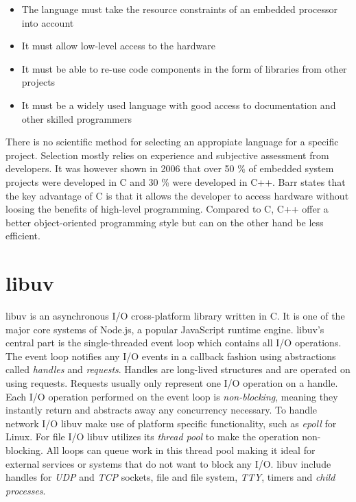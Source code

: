 \begin{itemize}
\item
  The language must take the resource constraints of an embedded processor
  into account
\item
  It must allow low-level access to the hardware
\item
  It must be able to re-use code components in the form of libraries from other
    projects
\item
  It must be a widely used language with good access to documentation and other
    skilled programmers
\end{itemize}

There is no scientific method for selecting an appropiate language for a
specific project. Selection mostly relies on experience and subjective
assessment from developers. It was however shown in 2006 that over 50 \% of
embedded system projects were developed in C and 30 \% were developed in C++.
Barr \cite{barr1999programming} states that the key advantage of C is that it
allows the developer to access hardware without loosing the benefits of
high-level programming. Compared to C, C++ offer a better object-oriented
programming style but can on the other hand be less efficient.
\cite{nahas2012choosing}

\section{libuv}

libuv is an asynchronous I/O cross-platform library written in C. It is one of
the major core systems of Node.js, a popular JavaScript runtime engine. libuv's
central part is the single-threaded event loop which contains all I/O
operations. The event loop notifies any I/O events in a callback fashion using
abstractions called \textit{handles} and \textit{requests}. Handles are
long-lived structures and are operated on using requests. Requests usually only
represent one I/O operation on a handle. Each I/O operation performed on the
event loop is \textit{non-blocking}, meaning they instantly return and
abstracts away any concurrency necessary. To handle network I/O libuv make use
of platform specific functionality, such as \textit{epoll} for Linux. For file
I/O libuv utilizes its \textit{thread pool} to make the operation non-blocking.
All loops can queue work in this thread pool making it ideal for external
services or systems that do not want to block any I/O. libuv include handles
for \textit{UDP} and \textit{TCP} sockets, file and file system, \textit{TTY},
timers and \textit{child processes}. \cite{libuv-docs}

